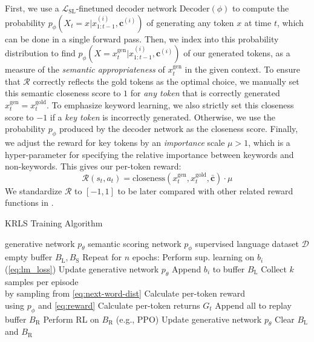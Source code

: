 First, we use a $\mathcal{L}_{\mathrm{SL}}$-finetuned decoder network $\mathrm{Decoder}(\phi)$ to compute the probability $p_\phi(X_t=x|x^{(i)}_{1:t-1},\mathbf{c}^{(i)})$ of generating any token $x$ at time $t$, which can be done in a single forward pass. Then, we index into this probability distribution to find $p_\phi(X=x^{\mathrm{gen}}_t|x^{(i)}_{1:t-1},\mathbf{c}^{(i)})$ of our generated tokens, as a measure of the \emph{semantic appropriateness} of $x^{\mathrm{gen}}_t$ in the given context. 
To ensure that $\mathcal{R}$ correctly reflects the gold tokens as the optimal choice, we manually set this semantic closeness score to $1$ for \emph{any token} that is correctly generated $x^{\mathrm{gen}}_t = x_t^{\mathrm{gold}}$.
To emphasize keyword learning, we also strictly set this closeness score to $-1$ if a \emph{key token} is incorrectly generated. Otherwise, we use the probability $p_\phi$ produced by the decoder network as the closeness score.
Finally, we adjust the reward for key tokens by an \emph{importance} scale $\mu>1$, which is a hyper-parameter for specifying the relative importance between keywords and non-keywords. This gives our per-token reward:
\begin{equation}\label{eq:reward}
  \mathcal{R}(s_t,a_t) = \mathrm{closeness}(x^{\mathrm{gen}}_t, x^{\mathrm{gold}}_t, \mathbf{\bar{c}}) \cdot \mu
\end{equation}
We standardize $\mathcal{R}$ to $[-1,1]$ to be later compared with other related reward functions in .
\begin{algorithm}
	\caption{KRLS Training Algorithm}\label{algo:krls_algorithm}
	\begin{algorithmic}[1]
  \Require generative network $p_\theta$
  \Require semantic scoring network $p_\phi$
  \Require supervised language dataset $\mathcal{D}$
  \Require empty buffer $B_{\mathrm{L}}, B_{\mathrm{S}}$
  \State Repeat for $n$ epochs:
    \State Perform sup. learning on $b_{i}$ (\autoref{eq:lm_loss})
    \State Update generative network $p_\theta$
    \State Append $b_{i}$ to buffer $B_{\mathrm{L}}$
    \State Collect $k$ samples per episode \\ \label{lst:line:}
      \qquad\qquad\qquad by sampling from \autoref{eq:next-word-dist}
    \State Calculate per-token reward \\
      \qquad\qquad\qquad using $p_\phi$ and \autoref{eq:reward}
    \State Calculate per-token returns $G_t$
    \State Append all to replay buffer $B_{\mathrm{R}}$ \label{lst:line:replay_buf}
    \EndFor
    \State Perform RL on $B_{\mathrm{R}}$ 
    (e.g., PPO)
    \State Update generative network $p_\theta$
    \State Clear $B_{\mathrm{L}}$ and $B_{\mathrm{R}}$
    \EndIf
	\EndFor
	\end{algorithmic}
\end{algorithm}
